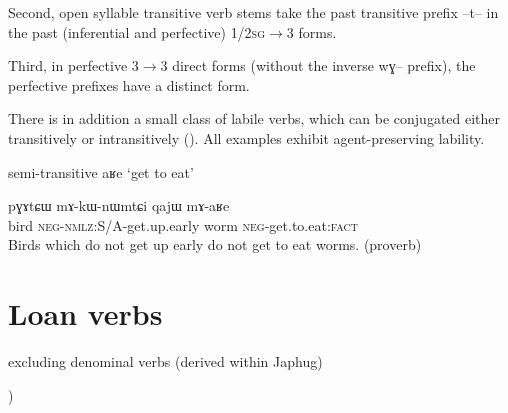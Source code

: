 \documentclass[oldfontcommands,oneside,a4paper,11pt]{article}
\newcommand{\ipa}[1]{{\phon \mbox{#1}}} %
\begin{document}
 Second, open syllable transitive verb stems take the past transitive prefix \ipa{--t--} in the past (inferential and perfective) \textsc{1/2sg}$\rightarrow$3 forms. 
 
 
 Third, in perfective 3$\rightarrow$3 direct forms (without the inverse \ipa{wɣ--} prefix), the perfective prefixes have a distinct form.

There is in addition a small class of labile verbs, which can be conjugated either transitively or intransitively (\citealt{jacques12demotion}). All examples exhibit agent-preserving  lability.
  
  
semi-transitive \ipa{aʁe} `get to eat' 
  
\begin{exe}
\ex
\gll
\ipa{pɣɤtɕɯ}  	\ipa{mɤ-kɯ-nɯmtɕi}  	\ipa{qajɯ}  	\ipa{mɤ-aʁe}  \\
bird \textsc{neg-nmlz}:S/A-get.up.early worm \textsc{neg}-get.to.eat:\textsc{fact} \\
\glt Birds which do not get up early do not get to eat worms. (proverb) 
\end{exe}  
  
  \section{Loan verbs}
  
  excluding denominal verbs (derived within Japhug)
  
  
\citealt[133-140]{jacques04these})  
  
\end{document}

